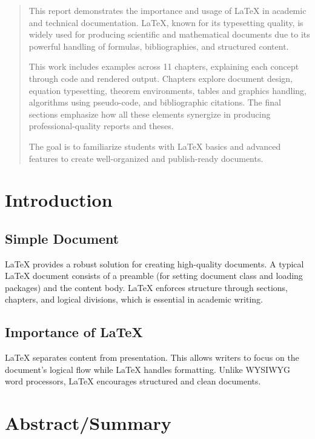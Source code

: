 \documentclass[12pt,a4paper]{report}
\begin{document}
\begin{abstract}
\justify
This report demonstrates the importance and usage of LaTeX in academic and technical documentation. LaTeX, known for its typesetting quality, is widely used for producing scientific and mathematical documents due to its powerful handling of formulas, bibliographies, and structured content.

This work includes examples across 11 chapters, explaining each concept through code and rendered output. Chapters explore document design, equation typesetting, theorem environments, tables and graphics handling, algorithms using pseudo-code, and bibliographic citations. The final sections emphasize how all these elements synergize in producing professional-quality reports and theses.

The goal is to familiarize students with LaTeX basics and advanced features to create well-organized and publish-ready documents.
\end{abstract}

\newpage

\tableofcontents
\newpage

\chapter{Introduction}
\section{Simple Document}
\justify
\lipsum[1-3]
LaTeX provides a robust solution for creating high-quality documents. A typical LaTeX document consists of a preamble (for setting document class and loading packages) and the content body. 
LaTeX enforces structure through sections, chapters, and logical divisions, which is essential in academic writing.

\section{Importance of LaTeX}
\justify
LaTeX separates content from presentation. This allows writers to focus on the document's logical flow while LaTeX handles formatting. Unlike WYSIWYG word processors, LaTeX encourages structured and clean documents.

\lipsum[4]

\chapter{Abstract/Summary}
\end{document}
